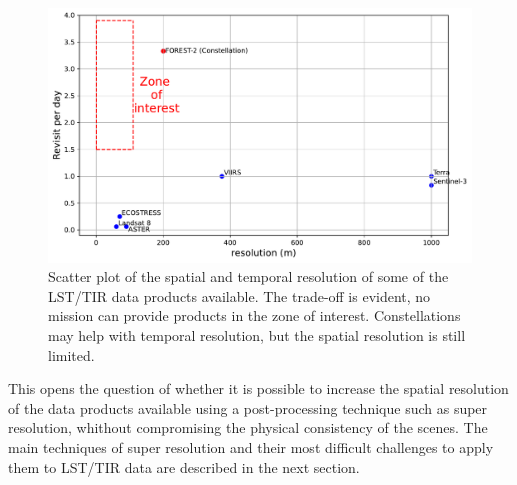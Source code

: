         \begin{figure}[H]
            \centering
            \includegraphics[width=\textwidth]{Includes/2-scatterplot-res-revisit.pdf}
            \caption{Scatter plot of the spatial and temporal resolution of some of the LST/TIR data products available.
                     The trade-off is evident, no mission can provide products in the zone of interest.
                     Constellations may help with temporal resolution, but the spatial resolution is still limited.}
            \label{fig:1-spatio-temporal-trade-off}
        \end{figure}

        This opens the question of whether it is possible to increase the spatial resolution of the data products available using a post-processing technique such as super resolution, whithout compromising the physical consistency of the scenes.
        The main techniques of super resolution and their most difficult challenges to apply them to LST/TIR data are described in the next section.

\newpage